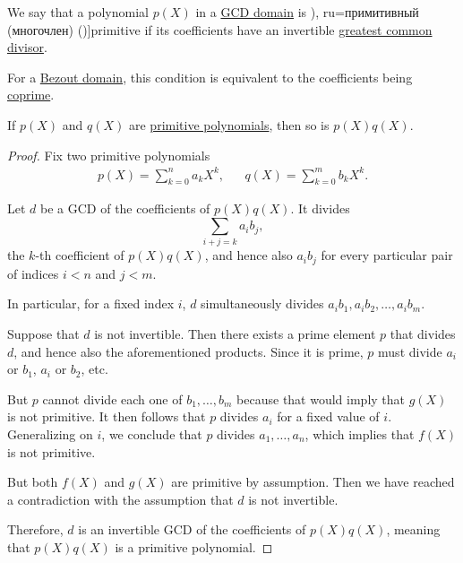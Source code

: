 \begin{definition}\label{def:primitive_polynomial}
  We say that a polynomial \( p(X) \) in a \hyperref[def:gcd_domain]{GCD domain} is \term[bg=примитивен (полином) (\cite[43]{ГеновМиховскиМоллов1991}), ru=примитивный (многочлен) (\cite[124]{Винберг2014})]{primitive} if its coefficients have an invertible \hyperref[def:gcd]{greatest common divisor}.
\end{definition}
\begin{comments}
  \item For a \hyperref[def:bezout_domain]{Bezout domain}, this condition is equivalent to the coefficients being \hyperref[def:coprime_elements]{coprime}.
\end{comments}

\begin{lemma}\label{thm:gauss_lemma}
  If \( p(X) \) and \( q(X) \) are \hyperref[def:primitive_polynomial]{primitive polynomials}, then so is \( p(X) q(X) \).
\end{lemma}
\begin{proof}
  Fix two primitive polynomials
  \begin{align*}
    p(X) = \sum_{k=0}^n a_k X^k,
    &&
    q(X) = \sum_{k=0}^m b_k X^k.
  \end{align*}

  Let \( d \) be a GCD of the coefficients of \( p(X) q(X) \). It divides
  \begin{equation*}
    \sum_{i+j=k} a_i b_j,
  \end{equation*}
  the \( k \)-th coefficient of \( p(X) q(X) \), and hence also \( a_i b_j \) for every particular pair of indices \( i < n \) and \( j < m \).

  In particular, for a fixed index \( i \), \( d \) simultaneously divides \( a_i b_1, a_i b_2, \ldots, a_i b_m \).

  Suppose that \( d \) is not invertible. Then there exists a prime element \( p \) that divides \( d \), and hence also the aforementioned products. Since it is prime, \( p \) must divide \( a_i \) or \( b_1 \), \( a_i \) or \( b_2 \), etc.

  But \( p \) cannot divide each one of \( b_1, \ldots, b_m \) because that would imply that \( g(X) \) is not primitive. It then follows that \( p \) divides \( a_i \) for a fixed value of \( i \). Generalizing on \( i \), we conclude that \( p \) divides \( a_1, \ldots, a_n \), which implies that \( f(X) \) is not primitive.

  But both \( f(X) \) and \( g(X) \) are primitive by assumption. Then we have reached a contradiction with the assumption that \( d \) is not invertible.

  Therefore, \( d \) is an invertible GCD of the coefficients of \( p(X) q(X) \), meaning that \( p(X) q(X) \) is a primitive polynomial.
\end{proof}

